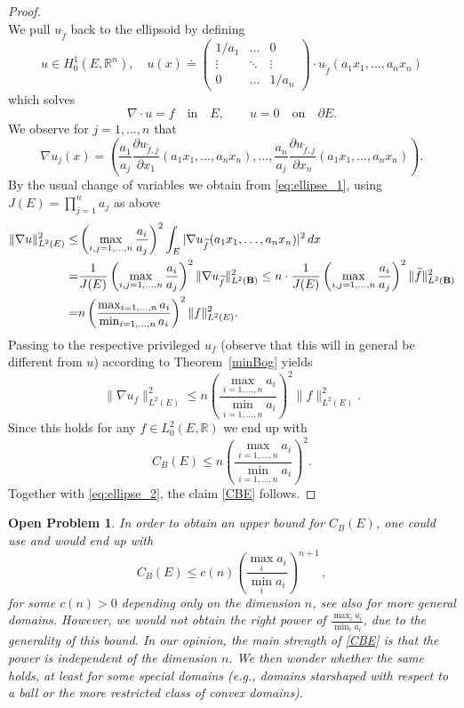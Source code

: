 \documentclass[11pt]{article}
\theoremstyle{plain}
\newtheorem{problem}{Open Problem}
\theoremstyle{definition}
\numberwithin{equation}{section}
\newcommand{\R}{\mathbb{R}}
\newcommand{\B}{{\bf B}}
\begin{document}
\begin{proof}
\begin{equation}
	\end{equation}
	We pull $ u_{\widetilde f}$ back to the ellipsoid by defining
	$$
	u\in H^1_0(E,\R^n), \quad u(x)\doteq \begin{pmatrix}
	1/a_1 & \dots & 0\\
	\vdots & \ddots & \vdots\\
	0 & \dots & 1/a_n
	\end{pmatrix}\cdot u_{\widetilde f} (a_1 x_1,\ldots,a_n x_n)
	$$
	which solves
	$$
	\nabla \cdot u =f\quad \text{in}\quad E,\qquad  u=0 \quad \text{on}\quad \partial E.
	$$
	We observe for $j=1,\ldots,n$ that
	$$
	\nabla u_j(x)= \left(\frac{a_1}{a_j} \frac{\partial u_{\widetilde f,j}}{\partial x_1}(a_1 x_1,\ldots,a_n x_n), \ldots, \frac{a_n}{a_j} \frac{\partial u_{\widetilde f,j}}{\partial x_n}(a_1 x_1,\ldots,a_n x_n)\right) .
	$$
	By the usual change of variables we obtain from \eqref{eq:ellipse_1},
	using $J(E)=\prod_{j=1}^n a_j$ as above
	\begin{align*}
	\| \nabla u \|^2_{L^2(E)}\le& \left( \max_{i,j=1,\ldots,n}\frac{a_i}{a_j}\right)^2
	\int_E |\nabla u_{\widetilde f} (a_1 x_1,\ldots,a_n x_n)|^2\, dx \\
	=&\frac{1}{J(E)}\left( \max_{i,j=1,\ldots,n}\frac{a_i}{a_j}\right)^2
	\| \nabla u_{\widetilde f} \|^2_{L^2(\B)}
	\le n\cdot \frac{1}{J(E)}\left( \max_{i,j=1,\ldots,n}\frac{a_i}{a_j}\right)^2 \| {\widetilde f} \|^2_{L^2(\B)}\\
	=& n \left( \frac{\max_{i=1,\ldots,n}a_i}{\min_{i=1,\ldots,n}a_i} \right)^2 \| { f} \|^2_{L^2(E)}.
	\end{align*}
	Passing to the respective privileged $u_f$ (observe that this will in general be different from $u$) according to Theorem~\ref{minBog} yields
	$$
	\| \nabla u_f \|^2_{L^2(E)}\le n \left( \frac{\max_{i=1,\ldots,n}a_i}{\min_{i=1,\ldots,n}a_i} \right)^2 \| { f} \|^2_{L^2(E)}.
	$$
	Since this holds for any $f\in L^2_0 (E,\R)$ we end up with
	$$
	C_B(E)\le  n \left( \frac{\max_{i=1,\ldots,n}a_i}{\min_{i=1,\ldots,n}a_i} \right)^2.
	$$
	Together with \eqref{eq:ellipse_2}, the claim \eqref{CBE} follows.
\end{proof}

\begin{problem}\label{star}
In order to obtain an upper bound for $C_B(E)$, one could use \cite[(III.3.4)]{galdi2011introduction} and would end up with
$$
C_B(E)\le c(n)\left(\frac{\max_ia_i}{\min_ia_i}\right)^{n+1}\, ,
$$
for some $c(n)>0$ depending only on the dimension $n$, see also \cite[Theorem III.3.1]{galdi2011introduction} for more general domains.
However, we would not obtain the right power of $\frac{\max_ia_i}{\min_ia_i}$, due to the generality of this bound.
In our opinion, the main strength of \eqref{CBE} is that the power is independent of the dimension $n$. We then wonder whether the same holds,
at least for some special domains (e.g., domains starshaped with respect to a ball or the more restricted class of convex domains).
\end{problem}
\end{document}
